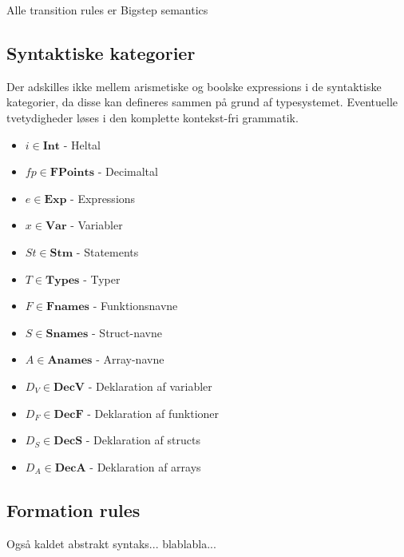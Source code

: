 Alle transition rules er Bigstep semantics

\subsection{Syntaktiske kategorier}

Der adskilles ikke mellem arismetiske og boolske expressions i de syntaktiske kategorier, da disse kan defineres sammen på grund af typesystemet. Eventuelle tvetydigheder løses i den komplette kontekst-fri grammatik.

\begin{itemize}
    \item $ i \in \textbf{Int} $ - Heltal
    \item $ fp \in \textbf{FPoints} $ - Decimaltal
    \item $ e \in \textbf{Exp} $ - Expressions
    \item $ x \in \textbf{Var} $ - Variabler
    \item $ St \in \textbf{Stm} $ - Statements
    \item $ T \in \textbf{Types} $ - Typer
    \item $ F \in \textbf{Fnames} $ - Funktionsnavne
    \item $ S \in \textbf{Snames} $ - Struct-navne
    \item $ A \in \textbf{Anames} $ - Array-navne
    \item $ D_V \in \textbf{DecV} $ - Deklaration af variabler
    \item $ D_F \in \textbf{DecF} $ - Deklaration af funktioner
    \item $ D_S \in \textbf{DecS} $ - Deklaration af structs
    \item $ D_A \in \textbf{DecA} $ - Deklaration af arrays
\end{itemize}


\subsection{Formation rules}
Også kaldet abstrakt syntaks... blablabla...

